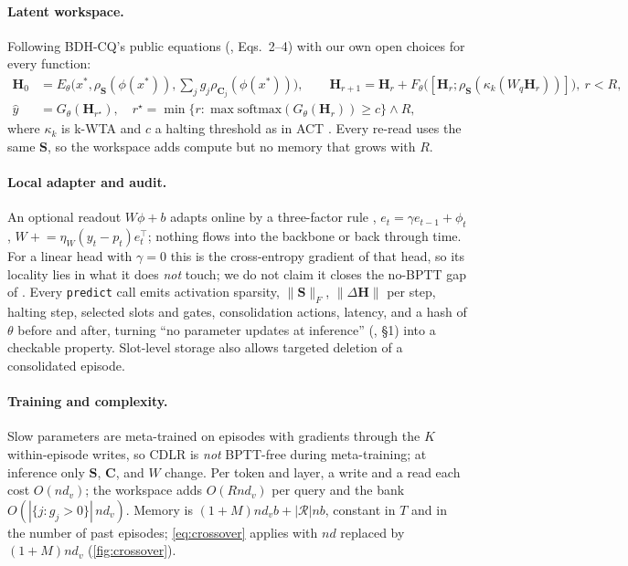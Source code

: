 \documentclass[10pt]{article}
\theoremstyle{remark}
\newcommand{\Sm}{\mathbf{S}}
\newcommand{\Cm}{\mathbf{C}}
\newcommand{\Hm}{\mathbf{H}}
\newcommand{\cdlr}{\textsc{CDLR}}
\begin{document}
\paragraph{Latent workspace.} Following BDH-CQ's public equations (\citealp{engdahl2026bdhcq}, Eqs.~2--4) with our
own open choices for every function:
\begin{align}
\Hm_0&=E_\theta\big(x^*,\rho_\Sm(\phi(x^*)),\textstyle\sum_jg_j\rho_{\Cm_j}(\phi(x^*))\big),\qquad
\Hm_{r+1}=\Hm_r+F_\theta\big([\Hm_r;\rho_\Sm(\kappa_k(W_q\Hm_r))]\big),\ r<R,\\
\hat y&=G_\theta(\Hm_{r^\star}),\quad r^\star=\min\{r:\max\mathrm{softmax}(G_\theta(\Hm_r))\ge c\}\wedge R,
\end{align}
where $\kappa_k$ is k-WTA and $c$ a halting threshold as in ACT \citep{graves2016act}. Every re-read uses the same
$\Sm$, so the workspace adds compute but no memory that grows with $R$.

\paragraph{Local adapter and audit.} An optional readout $W\phi+b$ adapts online by a three-factor rule
\citep{gerstner2018eligibility}, $e_t=\gamma e_{t-1}+\phi_t$, $W\mathrel{+}=\eta_W(y_t-p_t)e_t^\top$; nothing flows into
the backbone or back through time. For a linear head with $\gamma=0$ this is the cross-entropy gradient of that
head, so its locality lies in what it does \emph{not} touch; we do not claim it closes the no-BPTT gap of
\citet[\S7.2]{kosowski2025bdh}. Every \texttt{predict} call emits activation sparsity, $\|\Sm\|_F$, $\|\Delta\Hm\|$ per
step, halting step, selected slots and gates, consolidation actions, latency, and a hash of $\theta$ before and after,
turning ``no parameter updates at inference'' (\citealp{engdahl2026bdhcq}, \S1) into a checkable property. Slot-level
storage also allows targeted deletion of a consolidated episode.

\paragraph{Training and complexity.} Slow parameters are meta-trained on episodes with gradients through the $K$
within-episode writes, so \cdlr{} is \emph{not} BPTT-free during meta-training; at inference only $\Sm$, $\Cm$, and $W$
change. Per token and layer, a write and a read each cost $O(nd_v)$; the workspace adds $O(Rnd_v)$ per query and the
bank $O(|\{j:g_j>0\}|\,nd_v)$. Memory is $(1+M)nd_v b+|\mathcal{R}|nb$, constant in $T$ and in the number of past
episodes; \cref{eq:crossover} applies with $nd$ replaced by $(1+M)nd_v$ (\cref{fig:crossover}).
\end{document}
